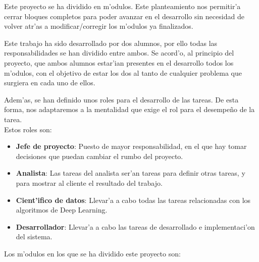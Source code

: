 Este proyecto se ha dividido en m'odulos. Este planteamiento nos permitir'a cerrar bloques completos para poder avanzar en el desarrollo sin necesidad de volver atr'as a modificar/corregir los m'odulos ya finalizados.

Este trabajo ha sido desarrollado por dos alumnos, por ello todas las responsabilidades se han dividido entre ambos. Se acord'o, al principio del proyecto, que ambos alumnos estar'ian presentes en el desarrollo todos los m'odulos, con el objetivo de estar los dos al tanto de cualquier problema que surgiera en cada uno de ellos.

Adem'as, se han definido unos roles para el desarrollo de las tareas. De esta forma, nos adaptaremos a la mentalidad que exige el rol para el desempeño de la tarea.
\\

Estos roles son:
\begin{itemize}
\item \textbf{Jefe de proyecto}: Puesto de mayor responsabilidad, en el que hay tomar decisiones que puedan cambiar el rumbo del proyecto.
\item \textbf{Analista}: Las tareas del analista ser'an tareas para definir otras tareas, y para mostrar al cliente el resultado del trabajo.
\item \textbf{Cient'ifico de datos}: Llevar'a a cabo todas las tareas relacionadas con los algoritmos de Deep Learning.
\item \textbf{Desarrollador}: Llevar'a a cabo las tareas de desarrollado e implementaci'on del sistema.
\end{itemize}

Los m'odulos en los que se ha dividido este proyecto son:

